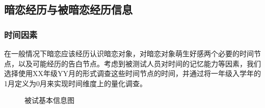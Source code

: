 \documentclass[10pt, a4paper, twocolumn]{ctexart}
\begin{document}
\subsection{暗恋经历与被暗恋经历信息}
\subsubsection{时间因素}
在一般情况下暗恋应该经历认识暗恋对象，对暗恋对象萌生好感两个必要的时间节点，以及可能经历的告白节点。考虑到被测试人员对时间的记忆能力等因素，我们选择使用XX年级YY月的形式调查这些时间节点的时间，并通过将一年级入学年的1月定义为0月来实现时间维度上的量化调查。
\begin{figure}[htbp]
	\quad
	\caption{被试基本信息图} %
\end{figure}
\end{document}
